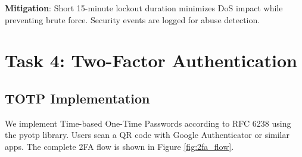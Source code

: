 \documentclass[12pt,a4paper]{article}
\begin{document}
\textbf{Mitigation}: Short 15-minute lockout duration minimizes DoS impact while preventing brute force. Security events are logged for abuse detection.

\section{Task 4: Two-Factor Authentication}

\subsection{TOTP Implementation}

We implement Time-based One-Time Passwords according to RFC 6238 \cite{mraihi2011} using the pyotp library. Users scan a QR code with Google Authenticator or similar apps. The complete 2FA flow is shown in Figure \ref{fig:2fa_flow}.
\end{document}
